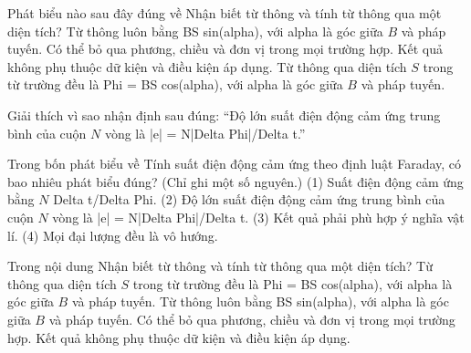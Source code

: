 \begin{ex}
Phát biểu nào sau đây đúng về Nhận biết từ thông và tính từ thông qua một diện tích?
\choice
{Từ thông luôn bằng BS sin(alpha), với alpha là góc giữa $B$ và pháp tuyến.}
{Có thể bỏ qua phương, chiều và đơn vị trong mọi trường hợp.}
{Kết quả không phụ thuộc dữ kiện và điều kiện áp dụng.}
{\True Từ thông qua diện tích $S$ trong từ trường đều là Phi = BS cos(alpha), với alpha là góc giữa $B$ và pháp tuyến.}
\end{ex}

\begin{bt}
Giải thích vì sao nhận định sau đúng: “Độ lớn suất điện động cảm ứng trung bình của cuộn $N$ vòng là |e| = N|Delta Phi|/Delta t.”
\end{bt}

\begin{ex}
Trong bốn phát biểu về Tính suất điện động cảm ứng theo định luật Faraday, có bao nhiêu phát biểu đúng? (Chỉ ghi một số nguyên.) (1) Suất điện động cảm ứng bằng $N$ Delta t/Delta Phi. (2) Độ lớn suất điện động cảm ứng trung bình của cuộn $N$ vòng là |e| = N|Delta Phi|/Delta t. (3) Kết quả phải phù hợp ý nghĩa vật lí. (4) Mọi đại lượng đều là vô hướng.
\end{ex}

\begin{ex}
Trong nội dung Nhận biết từ thông và tính từ thông qua một diện tích?
\choice
{\True Từ thông qua diện tích $S$ trong từ trường đều là Phi = BS cos(alpha), với alpha là góc giữa $B$ và pháp tuyến.}
{Từ thông luôn bằng BS sin(alpha), với alpha là góc giữa $B$ và pháp tuyến.}
{Có thể bỏ qua phương, chiều và đơn vị trong mọi trường hợp.}
{Kết quả không phụ thuộc dữ kiện và điều kiện áp dụng.}
\end{ex}

